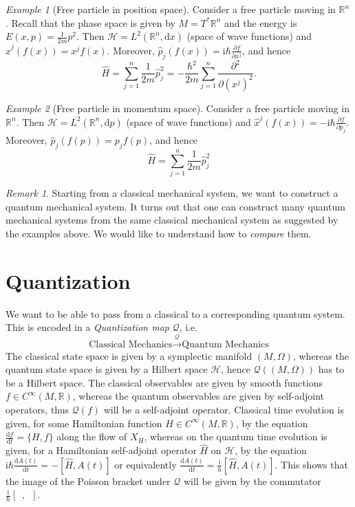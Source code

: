 \documentclass[12pt]{amsart}
\numberwithin{equation}{section}
\theoremstyle{plain}
\theoremstyle{definition}
\theoremstyle{remark}
\newtheorem{rem}{Remark}[subsection]
\newtheorem{ex}{Example}[subsection]
\newcommand{\R}{\mathbb{R}}
\newcommand{\dd}{{\mathrm{d}}}
\newcommand{\calH}{\mathcal{H}}
\newcommand{\I}{\mathrm{i}}
\begin{document}
\begin{ex}[Free particle in position space]
Consider a free particle moving in $\R^n$. Recall that the phase space is given by $M=T^*\R^n$ and the energy is $E(x,p)=\frac{1}{2m}p^2$. Then $\calH=L^2(\R^n,\dd x)$ (space of wave functions) and $\widehat{x}^j(f(x))=x^jf(x)$. Moreover, $\widehat{p}_j(f(x))=\I\hbar\frac{\partial f}{\partial x^j}$, and hence 
$$\widehat{H}=\sum_{j=1}^n\frac{1}{2m}\widehat{p}_j^2=-\frac{\hbar^2}{2m}\sum_{j=1}^n\frac{\partial^2}{\partial (x^j)^2}.$$
\end{ex}

\begin{ex}[Free particle in momentum space]
Consider a free particle moving in $\R^n$. Then $\calH=L^2(\R^n,\dd p)$ (space of wave functions) and $\widehat{x}^j(f(x))=-\I\hbar\frac{\partial f}{\partial p_j}$. Moreover, $\widehat{p}_j(f(p))=p_jf(p)$, and hence 
$$\widehat{H}=\sum_{j=1}^n\frac{1}{2m}\widehat{p}_j^2$$
\end{ex}

\begin{rem}
Starting from a classical mechanical system, we want to construct a quantum mechanical system. It turns out that one can construct many quantum mechanical systems from the same classical mechanical system as suggested by the examples above. We would like to understand how to \emph{compare} them.
\end{rem}

\section{Quantization}
We want to be able to pass from a classical to a corresponding quantum system. This is encoded in a \emph{Quantization map} $\mathscr{Q}$, i.e.
\[
\text{Classical Mechanics}\xrightarrow{\mathscr{Q}}\text{Quantum Mechanics}
\]
The classical state space is given by a symplectic manifold $(M,\Omega)$, whereas the quantum state space is given by a Hilbert space $\calH$, hence $\mathscr{Q}((M,\Omega))$ has to be a Hilbert space. The classical observables are given by smooth functions $f\in C^\infty(M,\R)$, whereas the quantum observables are given by self-adjoint operators, thus $\mathscr{Q}(f)$ will be a self-adjoint operator. Classical time evolution is given, for some Hamiltonian function $H\in C^\infty(M,\R)$, by the equation $\frac{\dd f}{\dd t}=\{H,f\}$ along the flow of $X_H$, whereas on the quantum time evolution is given, for a Hamiltonian self-adjoint operator $\widehat{H}$ on $\calH$, by the equation $\I\hbar\frac{\dd A(t)}{\dd t}=-[\widehat{H},A(t)]$ or equivalently $\frac{\dd A(t)}{\dd t}=\frac{\I}{\hbar}[\widehat{H},A(t)]$. This shows that the image of the Poisson bracket under $\mathscr{Q}$ will be given by the commutator $\frac{\I}{\hbar}[\enspace,\enspace]$. 
\end{document}
